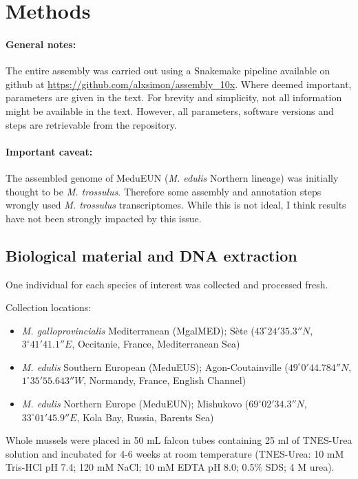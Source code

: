 \documentclass[11pt, a4paper]{article}
\begin{document}
\section{Methods}\label{methods}

\paragraph{General notes:}
The entire assembly was carried out using a Snakemake \parencite{Molder2021} pipeline available on github at \url{https://github.com/alxsimon/assembly_10x}.
Where deemed important, parameters are given in the text.
For brevity and simplicity, not all information might be available in the text.
However, all parameters, software versions and steps are retrievable from the repository.

\paragraph{Important caveat:}
The assembled genome of MeduEUN (\textit{M. edulis} Northern lineage) was initially thought to be \textit{M. trossulus}.
Therefore some assembly and annotation steps wrongly used \textit{M. trossulus} transcriptomes.
While this is not ideal, I think results have not been strongly impacted by this issue.


\subsection{Biological material and DNA extraction}

One individual for each species of interest was collected and processed fresh.

Collection locations:
\begin{itemize}
	\item \emph{M. galloprovincialis} Mediterranean (MgalMED); Sète ($43^\circ24'35.3''N$, $3^\circ41'41.1''E$, Occitanie, France, Mediterranean Sea)
	\item \emph{M. edulis} Southern European (MeduEUS); Agon-Coutainville ($49^\circ0'44.784''N$,\\$1^\circ35'55.643''W$, Normandy, France, English Channel)
	\item \emph{M. edulis} Northern Europe (MeduEUN); Mishukovo ($69^\circ02'34.3''N$, $33^\circ01'45.9''E$, Kola Bay, Russia, Barents Sea)
\end{itemize}

Whole mussels were placed in 50 mL falcon tubes containing 25 ml of TNES-Urea solution and incubated for 4-6 weeks at room temperature (TNES-Urea: 10 mM Tris-HCl pH 7.4; 120 mM NaCl; 10 mM EDTA pH 8.0; 0.5\% SDS; 4 M urea).
\end{document}
